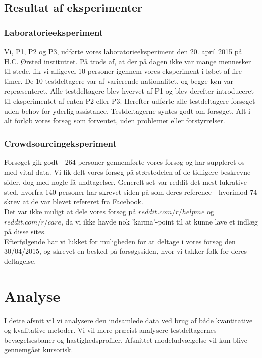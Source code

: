 \section*{Resultat af eksperimenter}

\subsection*{Laboratorieeksperiment}
Vi, P1, P2 og P3, udførte vores laboratorieeksperiment den 20. april 2015 på H.C. Ørsted instituttet. På trods af, at der på dagen ikke var mange mennesker til stede, fik vi alligevel 10 personer igennem vores eksperiment i løbet af fire timer. De 10 testdeltagere var af varierende nationalitet, og begge køn var repræsenteret. Alle testdeltagere blev hvervet af P1 og blev derefter introduceret til eksperimentet af enten P2 eller P3. Herefter udførte alle testdeltagere forsøget uden behov for yderlig assistance. Testdeltagerne syntes godt om forsøget. Alt i alt forløb vores forsøg som forventet, uden problemer eller forstyrrelser.

\subsection*{Crowdsourcingeksperiment}
Forsøget gik godt - 264 personer gennemførte vores forsøg og har suppleret os med vital data. Vi fik delt vores forsøg på størstedelen af de tidligere beskrevne sider, dog med nogle få undtagelser. Generelt set var reddit det mest lukrative sted, hvorfra 140 personer har skrevet siden på som deres reference - hvorimod 74 skrev at de var blevet refereret fra Facebook.\\
Det var ikke muligt at dele vores forsøg på $reddit.com/r/helpme$ og $reddit.com/r/care$, da vi ikke havde nok 'karma'-point til at kunne lave et indlæg på disse sites.\\
Efterfølgende har vi lukket for muligheden for at deltage i vores forsøg den 30/04/2015, og skrevet en besked på forsøgssiden, hvor vi takker folk for deres deltagelse.

\chapter*{Analyse}
I dette afsnit vil vi analysere den indsamlede data ved brug af både kvantitative og kvalitative metoder. Vi vil mere præcist analysere testdeltagernes bevægelsesbaner og hastighedsprofiler. Afsnittet modeludvælgelse vil kun blive gennemgået kursorisk.


